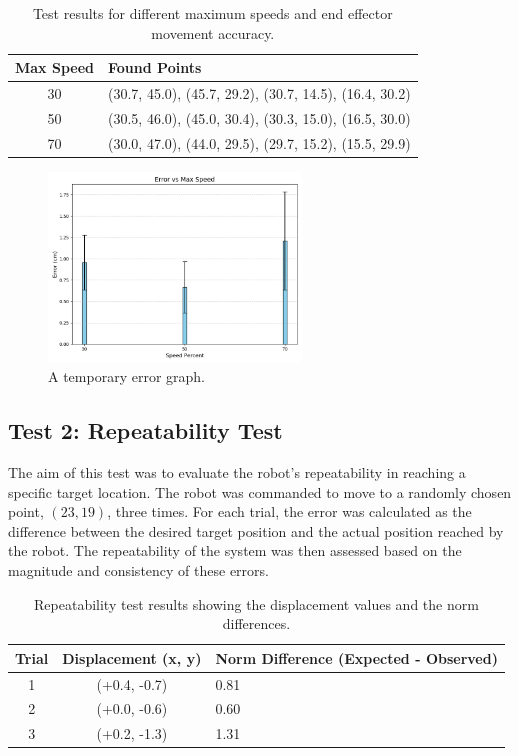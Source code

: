 \documentclass[11pt]{article}
\begin{document}
\begin{table}[h]
\centering
\begin{tabularx}{\textwidth}{|c|X|}
\hline
\textbf{Max Speed} & \textbf{Found Points} \\
\hline
30  & (30.7, 45.0), (45.7, 29.2), (30.7, 14.5), (16.4, 30.2) \\
\hline
50  & (30.5, 46.0), (45.0, 30.4), (30.3, 15.0), (16.5, 30.0) \\
\hline
70  & (30.0, 47.0), (44.0, 29.5), (29.7, 15.2), (15.5, 29.9) \\
\hline
\end{tabularx}
\caption{Test results for different maximum speeds and end effector movement accuracy.}
\label{tab:test_results}
\end{table}

\begin{figure}[h]
\centering
\includegraphics[width=0.6\textwidth]{Cont_motion_graph.png}
\caption{A temporary error graph.}
\label{fig:figure5}
\end{figure}

\subsection{Test 2: Repeatability Test}
The aim of this test was to evaluate the robot's repeatability in reaching a specific target location. The robot was commanded to move to a randomly chosen point, \((23, 19)\), three times. For each trial, the error was calculated as the difference between the desired target position and the actual position reached by the robot. The repeatability of the system was then assessed based on the magnitude and consistency of these errors.

\begin{table}[h]
\centering
\begin{tabularx}{\textwidth}{|c|c|X|}
\hline
\textbf{Trial} & \textbf{Displacement (x, y)} & \textbf{Norm Difference (Expected - Observed)} \\
\hline
1 & (+0.4, -0.7) & 0.81 \\
\hline
2 & (+0.0, -0.6) & 0.60 \\
\hline
3 & (+0.2, -1.3) & 1.31 \\
\hline
\end{tabularx}
\caption{Repeatability test results showing the displacement values and the norm differences.}
\label{tab:repeatability_test_norm}
\end{table}
\end{document}
